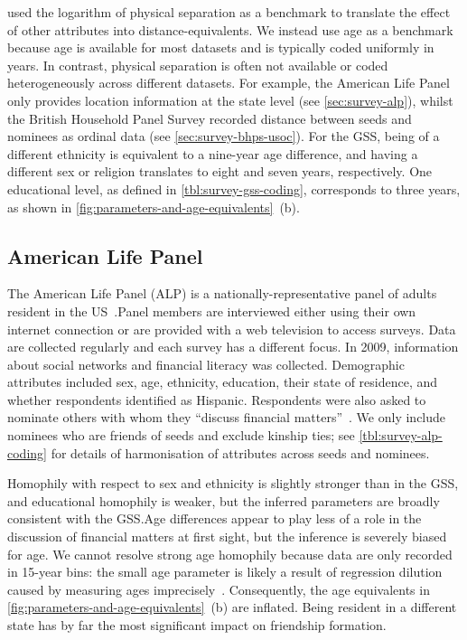\documentclass{scrartcl}
\begin{document}
\textcite{Hipp2009} used the logarithm of physical separation as a benchmark to translate the effect of other attributes into distance-equivalents. We instead use age as a benchmark because age is available for most datasets and is typically coded uniformly in years. In contrast, physical separation is often not available or coded heterogeneously across different datasets. For example, the American Life Panel only provides location information at the state level (see \cref{sec:survey-alp}), whilst the British Household Panel Survey recorded distance between seeds and nominees as ordinal data (see \cref{sec:survey-bhps-usoc}). For the GSS, being of a different ethnicity is equivalent to a nine-year age difference, and having a different sex or religion translates to eight and seven years, respectively. One educational level, as defined in \cref{tbl:survey-gss-coding}, corresponds to three years, as shown in \cref{fig:parameters-and-age-equivalents}~(b).

\subsection{American Life Panel\label{sec:survey-alp}}

The American Life Panel (ALP) is a nationally-representative panel of adults resident in the US~\cite{Pollard2017}.\@ Panel members are interviewed either using their own internet connection or are provided with a web television to access surveys. Data are collected regularly and each survey has a different focus. In 2009, information about social networks and financial literacy was collected. Demographic attributes included sex, age, ethnicity, education, their state of residence, and whether respondents identified as Hispanic. Respondents were also asked to nominate others with whom they ``discuss financial matters''~\cite{Mihaly2009}. We only include nominees who are friends of seeds and exclude kinship ties; see \cref{tbl:survey-alp-coding} for details of harmonisation of attributes across seeds and nominees.

Homophily with respect to sex and ethnicity is slightly stronger than in the GSS, and educational homophily is weaker, but the inferred parameters are broadly consistent with the GSS.\@ Age differences appear to play less of a role in the discussion of financial matters at first sight, but the inference is severely biased for age. We cannot resolve strong age homophily because data are only recorded in 15-year bins: the small age parameter is likely a result of regression dilution caused by measuring ages imprecisely~\cite{Hutcheon2010}. Consequently, the age equivalents in \cref{fig:parameters-and-age-equivalents}~(b) are inflated. Being resident in a different state has by far the most significant impact on friendship formation.
\end{document}
